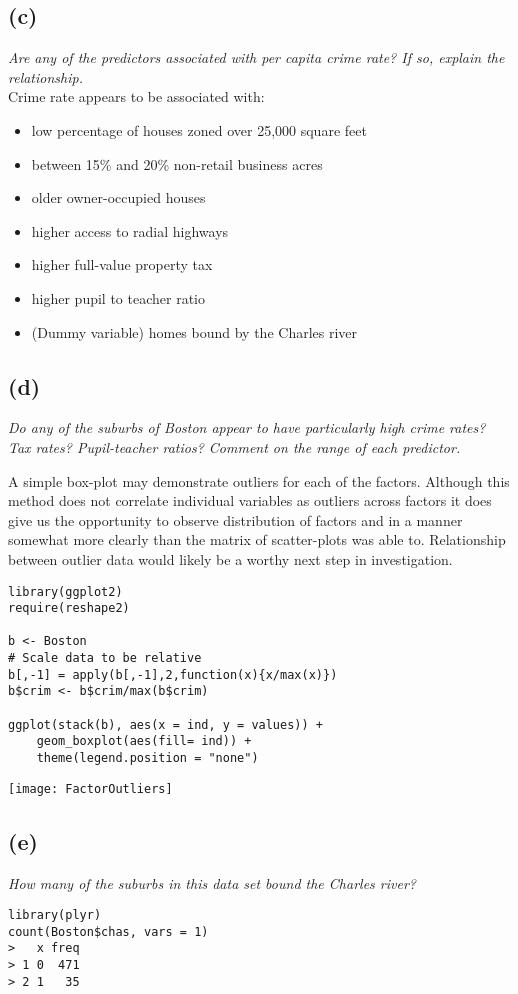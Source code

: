 \documentclass[a4paper,man,natbib]{apa6}
\begin{document}
\subsection{(c)}
\emph{Are any of the predictors associated with per capita crime rate?
If so, explain the relationship.} \\
Crime rate appears to be associated with:
\begin{itemize}
	\item low percentage of houses zoned over 25,000 square feet
	\item between 15\% and 20\% non-retail business acres
	\item older owner-occupied houses
	\item higher access to radial highways
	\item higher full-value property tax
	\item higher pupil to teacher ratio
	\item (Dummy variable) homes bound by the Charles river 
\end{itemize}

\subsection{(d)}
\emph{Do any of the suburbs of Boston appear to have particularly
high crime rates? Tax rates? Pupil-teacher ratios? Comment on
the range of each predictor.} \vspace{2em}

A simple box-plot may demonstrate outliers for each of the factors. Although this method does not correlate individual variables as outliers across factors it does give us the opportunity to observe distribution of factors and in a manner somewhat more clearly than the matrix of scatter-plots was able to. Relationship between outlier data would likely be a worthy next step in investigation. \\

\begin{verbatim}
library(ggplot2)
require(reshape2)

b <- Boston
# Scale data to be relative
b[,-1] = apply(b[,-1],2,function(x){x/max(x)})
b$crim <- b$crim/max(b$crim)

ggplot(stack(b), aes(x = ind, y = values)) +
	geom_boxplot(aes(fill= ind)) +
	theme(legend.position = "none") 
\end{verbatim}

\begin{center}
	\texttt{[image: FactorOutliers]}
\end{center}

\subsection{(e)}
\emph{How many of the suburbs in this data set bound the Charles
river?}
\begin{verbatim}
library(plyr)
count(Boston$chas, vars = 1)
>   x freq
> 1 0  471
> 2 1   35
\end{verbatim}
\end{document}
